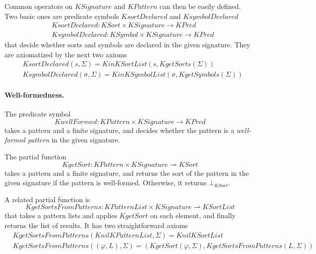 \documentclass[UTF8,11pt]{article}
\theoremstyle{plain}
\theoremstyle{definition}
\theoremstyle{remark}
\newcommand{\KPred}{\mathit{KPred}}
\newcommand{\KSort}{\mathit{KSort}}
\newcommand{\KSymbol}{\mathit{KSymbol}}
\newcommand{\KPatternList}{\mathit{KPatternList}}
\newcommand{\KnilKPatternList}{\mathit{KnilKPatternList}}
\newcommand{\KSortList}{\mathit{KSortList}}
\newcommand{\KnilKSortList}{\mathit{KnilKSortList}}
\newcommand{\KinKSortList}{\mathit{KinKSortList}}
\newcommand{\KinKSymbolList}{\mathit{KinKSymbolList}}
\newcommand{\KPattern}{\mathit{KPattern}}
\newcommand{\KSignature}{\mathit{KSignature}}
\newcommand{\KgetSorts}{\mathit{KgetSorts}}
\newcommand{\KgetSymbols}{\mathit{KgetSymbols}}
\newcommand{\KsortDeclared}{\mathit{KsortDeclared}}
\newcommand{\KsymbolDeclared}{\mathit{KsymbolDeclared}}
\newcommand{\KwellFormed}{\mathit{KwellFormed}}
\newcommand{\KgetSort}{\mathit{KgetSort}}
\newcommand{\KgetSortsFromPatterns}{\mathit{KgetSortsFromPatterns}}
\begin{document}
Common operators on $\KSignature$ and $\KPattern$ can then be easily defined.
Two basic ones are predicate symbols $\KsortDeclared$ and $\KsymbolDeclared$
\begin{align*}
 & \KsortDeclared \colon \KSort \times \KSignature \to \KPred \\
 & \KsymbolDeclared \colon \KSymbol \times \KSignature \to \KPred
\end{align*}
that decide whether sorts and symbols are declared in the given signature.
They are axiomatized by the next two axioms
\begin{align*}
 & \KsortDeclared(s, \Sigma) = \KinKSortList(s, \KgetSorts(\Sigma)) \\
 & \KsymbolDeclared(\sigma, \Sigma) = \KinKSymbolList(\sigma, \KgetSymbols(\Sigma))
\end{align*}

\paragraph{Well-formedness.}
The predicate symbol
$$\KwellFormed \colon \KPattern \times \KSignature \to \KPred$$ 
takes a pattern and a finite signature, and decides whether the pattern is a \emph{well-formed pattern} in the given signature.

The partial function
$$\KgetSort \colon \KPattern \times \KSignature \rightharpoonup \KSort$$
takes a pattern and a finite signature, and returns the sort of the pattern in the given signature if the pattern is well-formed.
Otherwise, it returns $\bot_\KSort$.

A related partial function is 
$$ \KgetSortsFromPatterns \colon \KPatternList \times \KSignature \rightharpoonup \KSortList
$$
that takes a pattern lists and applies $\KgetSort$ on each element, and finally returns the list of results.
It has two straightforward axioms
\begin{align*}
  & \KgetSortsFromPatterns(\KnilKPatternList, \Sigma) = \KnilKSortList
  \\
  & \KgetSortsFromPatterns((\varphi, L), \Sigma) = (\KgetSort(\varphi, \Sigma), \KgetSortsFromPatterns(L, \Sigma))
\end{align*}
\end{document}

